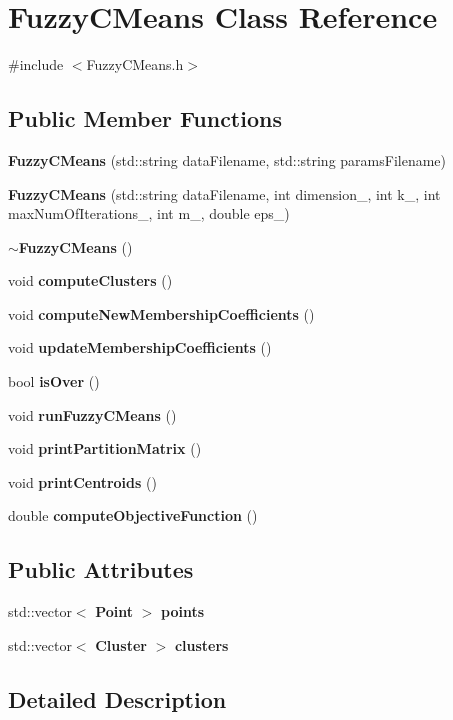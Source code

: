 \section{Fuzzy\+C\+Means Class Reference}
\label{class_fuzzy_c_means}


{\ttfamily \#include $<$Fuzzy\+C\+Means.\+h$>$}

\subsection*{Public Member Functions}
\begin{DoxyCompactItemize}
\item 
\textbf{ Fuzzy\+C\+Means} (std\+::string data\+Filename, std\+::string params\+Filename)
\item 
\textbf{ Fuzzy\+C\+Means} (std\+::string data\+Filename, int dimension\+\_\+, int k\+\_\+, int max\+Num\+Of\+Iterations\+\_\+, int m\+\_\+, double eps\+\_\+)
\item 
\textbf{ $\sim$\+Fuzzy\+C\+Means} ()
\item 
void \textbf{ compute\+Clusters} ()
\item 
void \textbf{ compute\+New\+Membership\+Coefficients} ()
\item 
void \textbf{ update\+Membership\+Coefficients} ()
\item 
bool \textbf{ is\+Over} ()
\item 
void \textbf{ run\+Fuzzy\+C\+Means} ()
\item 
void \textbf{ print\+Partition\+Matrix} ()
\item 
void \textbf{ print\+Centroids} ()
\item 
double \textbf{ compute\+Objective\+Function} ()
\end{DoxyCompactItemize}
\subsection*{Public Attributes}
\begin{DoxyCompactItemize}
\item 
std\+::vector$<$ \textbf{ Point} $>$ \textbf{ points}
\item 
std\+::vector$<$ \textbf{ Cluster} $>$ \textbf{ clusters}
\end{DoxyCompactItemize}


\subsection{Detailed Description}



